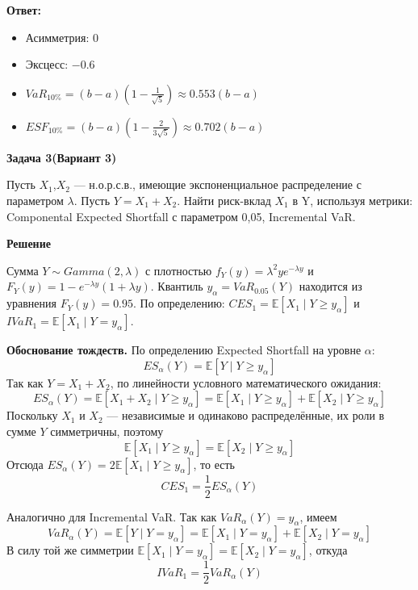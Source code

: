 \documentclass[a4paper,12pt]{extarticle}
\begin{document}
\textbf{Ответ:}
\begin{itemize}
    \item Асимметрия: $0$
    \item Эксцесс: $-0.6$
    \item $VaR_{10\%} = (b-a)\left(1 - \frac{1}{\sqrt{5}}\right) \approx 0.553(b-a)$
    \item $ESF_{10\%} = (b-a)\left(1 - \frac{2}{3\sqrt{5}}\right) \approx 0.702(b-a)$
\end{itemize}

\begin{center}
    \textbf{Задача 3(Вариант 3)}
\end{center}
Пусть $X_1$,$X_2$ — н.о.р.с.в., имеющие экспоненциальное распределение с параметром $\lambda$. Пусть $Y= X_1 + X_2$. Найти риск-вклад $X_1$ в Y, используя метрики: Componental Expected Shortfall с параметром 0,05, Incremental VaR.
\begin{center}
    \textbf{Решение}
\end{center}

Сумма $Y \sim Gamma(2, \lambda)$ с плотностью $f_Y(y) = \lambda^2 y e^{-\lambda y}$ и $F_Y(y) = 1 - e^{-\lambda y}(1+\lambda y)$.
Квантиль $y_{\alpha} = VaR_{0.05}(Y)$ находится из уравнения $F_Y(y) = 0.95$.
По определению: $CES_1 = \mathbb{E}[X_1 \mid Y \geq y_{\alpha}]$ и $IVaR_1 = \mathbb{E}[X_1 \mid Y = y_{\alpha}]$.

\textbf{Обоснование тождеств.}
По определению Expected Shortfall на уровне $\alpha$:
$$ES_{\alpha}(Y) = \mathbb{E}[Y \mid Y \geq y_{\alpha}]$$
Так как $Y = X_1 + X_2$, по линейности условного математического ожидания:
$$ES_{\alpha}(Y) = \mathbb{E}[X_1 + X_2 \mid Y \geq y_{\alpha}] = \mathbb{E}[X_1 \mid Y \geq y_{\alpha}] + \mathbb{E}[X_2 \mid Y \geq y_{\alpha}]$$
Поскольку $X_1$ и $X_2$ — независимые и одинаково распределённые, их роли в сумме $Y$ симметричны, поэтому
$$\mathbb{E}[X_1 \mid Y \geq y_{\alpha}] = \mathbb{E}[X_2 \mid Y \geq y_{\alpha}]$$
Отсюда $ES_{\alpha}(Y) = 2\mathbb{E}[X_1 \mid Y \geq y_{\alpha}]$, то есть
$$CES_1 = \frac{1}{2}ES_{\alpha}(Y)$$

Аналогично для Incremental VaR. Так как $VaR_{\alpha}(Y) = y_{\alpha}$, имеем
$$VaR_{\alpha}(Y) = \mathbb{E}[Y \mid Y = y_{\alpha}] = \mathbb{E}[X_1 \mid Y = y_{\alpha}] + \mathbb{E}[X_2 \mid Y = y_{\alpha}]$$
В силу той же симметрии $\mathbb{E}[X_1 \mid Y = y_{\alpha}] = \mathbb{E}[X_2 \mid Y = y_{\alpha}]$, откуда
$$IVaR_1 = \frac{1}{2}VaR_{\alpha}(Y)$$
\end{document}
